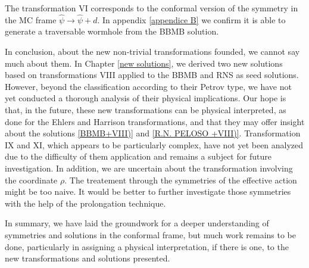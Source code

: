 The transformation VI corresponds to the conformal version of the symmetry in the MC frame $\hat{\psi}\rightarrow\hat{\psi}+d$. In appendix \ref{appendice B} we confirm it is able to generate a traversable wormhole from the BBMB solution.

In conclusion, about the new non-trivial transformations founded, we cannot say much about them. In Chapter \ref{new solutions}, we derived two new solutions based on transformations VIII applied to the BBMB and RNS as seed solutions. However, beyond the classification according to their Petrov type, we have not yet conducted a thorough analysis of their physical implications. Our hope is that, in the future, these new transformations can be physical interpreted, as done for the Ehlers and Harrison transformations, and that they may offer insight about the solutions \ref{BBMB+VIII)} and \ref{R.N. PELOSO +VIII)}. Transformation IX and XI, which appears to be particularly complex, have not yet been analyzed due to the difficulty of them application and remains a subject for future investigation. In addition, we are uncertain about the transformation involving the coordinate $\rho$. The treatement through the symmetries of the effective action might be too naive. It would be better to further investigate those symmetries with the help of the prolongation technique.

In summary, we have laid the groundwork for a deeper understanding of symmetries and solutions in the conformal frame, but much work remains to be done, particularly in assigning a physical interpretation, if there is one, to the new transformations and solutions presented.






